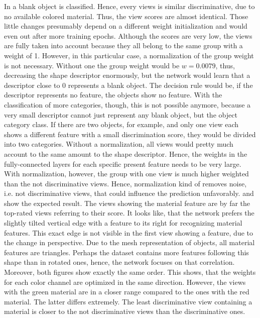 In  a blank object is classified.
Hence, every views is similar discriminative, due to no available colored material.
Thus, the view scores are almost identical.
Those little changes presumably depend on a different weight initialization and would even out after more training epochs.
Although the scores are very low, the views are fully taken into account because they all belong to the same group with a weight of 1.
However, in this particular case, a normalization of the group weight is not necessary.
Without one the group weight would be $w = 0.0079$, thus, decreasing the shape descriptor enormously, but the network would learn that a descriptor close to 0 represents a blank object.
The decision rule would be, if the descriptor represents no feature, the objects show no feature.
With the classification of more categories, though, this is not possible anymore, because a very small descriptor cannot just represent any blank object, but the object category class.
If there are two objects, for example, and only one view each shows a different feature with a small discrimination score, they would be divided into two categories.
Without a normalization, all views would pretty much account to the same amount to the shape descriptor.
Hence, the weights in the fully-connected layers for each specific present feature needs to be very large.
With normalization, however, the group with one view is much higher weighted than the not discriminative views.
Hence, normalization kind of removes noise, i.e. not discriminative views, that could influence the prediction unfavorably.
 and  show the expected result.
The views showing the material feature are by far the top-rated views referring to their score.
It looks like, that the network prefers the slightly tilted vertical edge with a feature to its right for recognizing material features.
This exact edge is not visible in the first view showing a feature, due to the change in perspective.
Due to the mesh representation of objects, all material features are triangles.
Perhaps the dataset contains more features following this shape than in rotated ones, hence, the network focuses on that correlation.
Moreover, both figures show exactly the same order.
This shows, that the weights for each color channel are optimized in the same direction.
However, the views with the green material are in a closer range compared to the ones with the red material.
The latter differs extremely.
The least discriminative view containing a material is closer to the not discriminative views than the discriminative ones.
